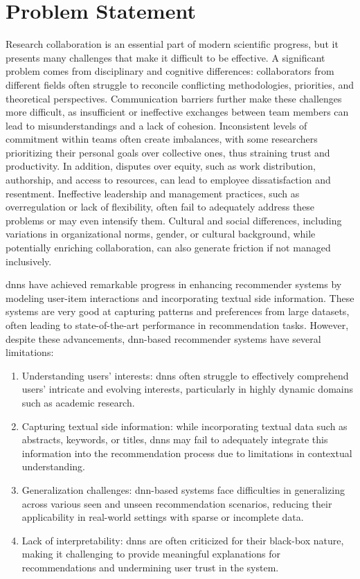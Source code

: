 \section{Problem Statement}\label{sec:problem-statement}

Research collaboration is an essential part of modern scientific progress, but it presents many challenges that make it difficult to be effective.
A significant problem comes from disciplinary and cognitive differences: collaborators from different fields often struggle to reconcile conflicting methodologies, priorities, and theoretical perspectives.
Communication barriers further make these challenges more difficult, as insufficient or ineffective exchanges between team members can lead to misunderstandings and a lack of cohesion.
Inconsistent levels of commitment within teams often create imbalances, with some researchers prioritizing their personal goals over collective ones, thus straining trust and productivity.
In addition, disputes over equity, such as work distribution, authorship, and access to resources, can lead to employee dissatisfaction and resentment.
Ineffective leadership and management practices, such as overregulation or lack of flexibility, often fail to adequately address these problems or may even intensify them.
Cultural and social differences, including variations in organizational norms, gender, or cultural background, while potentially enriching collaboration, can also generate friction if not managed inclusively.


\glspl{dnn} have achieved remarkable progress in enhancing recommender systems by modeling user-item interactions and incorporating textual side information.
These systems are very good at capturing patterns and preferences from large datasets, often leading to state-of-the-art performance in recommendation tasks.
However, despite these advancements, \gls{dnn}-based recommender systems have several limitations:
\begin{enumerate}
    \item Understanding users' interests: \glspl{dnn} often struggle to effectively comprehend users' intricate and evolving interests, particularly in highly dynamic domains such as academic research.
    \item Capturing textual side information: while incorporating textual data such as abstracts, keywords, or titles, \glspl{dnn} may fail to adequately integrate this information into the recommendation process due to limitations in contextual understanding.
	\item Generalization challenges: \gls{dnn}-based systems face difficulties in generalizing across various seen and unseen recommendation scenarios, reducing their applicability in real-world settings with sparse or incomplete data.
	\item Lack of interpretability: \glspl{dnn} are often criticized for their black-box nature, making it challenging to provide meaningful explanations for recommendations and undermining user trust in the system.
\end{enumerate}
		

